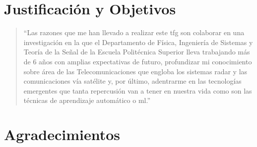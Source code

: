 
\chapter*{Justificación y Objetivos}
\thispagestyle{empty}
\begin{quote}
``Las razones que me han llevado a realizar este \gls{tfg} son colaborar en una investigación en la que el Departamento de Física, Ingeniería de Sistemas y Teoría de la Señal de la Escuela Politécnica Superior lleva trabajando más de 6 años con amplias expectativas de futuro, profundizar mi conocimiento sobre área de las Telecomunicaciones que engloba los sistemas radar y las comunicaciones vía satélite y, por último, adentrarme en las tecnologías emergentes que tanta repercusión van a tener en nuestra vida como son las técnicas de aprendizaje automático o \gls{ml}.''
\end{quote}


\cleardoublepage %
\chapter*{Agradecimientos}

\thispagestyle{empty}
\vspace{1cm}

